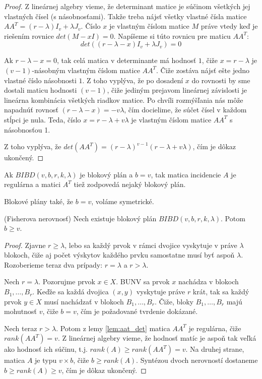 \begin{proof}
Z lineárnej algebry vieme, že determinant matice je súčinom všetkých jej vlastných čísel (s násobnosťami).
Takže treba nájsť všetky vlastné čísla matice $A A^T = (r-\lambda) I_v + \lambda J_{v}$.
Číslo $x$ je vlastným číslom matice $M$ práve vtedy keď je riešením rovnice $det(M - xI) = 0$.
Napíšeme si túto rovnicu pre maticu $AA^T$:
$$det((r-\lambda - x) I_v + \lambda J_{v}) = 0$$

Ak $r-\lambda - x = 0$, tak celá matica v determinante má hodnosť $1$, čiže $x = r - \lambda$ je $(v-1)$-násobným vlastným číslom matice $AA^T$. 
Čiže zostáva nájsť ešte jedno vlastné číslo násobnosti $1$.
Z toho vyplýva, že po dosadení $x$ do rovnosti by sme dostali maticu hodnosti $(v-1)$, čiže jediným prejavom lineárnej závislosti je lineárna kombinácia všetkých riadkov matice.
Po chvíli rozmýšľania nás môže napadnúť rovnosť $(r - \lambda - x) = - v \lambda$, čím docielime, že súčet čísel v každom stĺpci je nula.
Teda, číslo $x =r - \lambda + v\lambda $ je vlastným číslom matice $A A^T$ s násobnosťou 1.

Z toho vyplýva, že $det(AA^T) = (r - \lambda)^{v-1}(r - \lambda + v \lambda)$, čím je dôkaz ukončený.
\end{proof}

\begin{corollary}
Ak $BIBD(v, b,r, k, \lambda)$ je blokový plán a $b=v$, tak matica incidencie $A$ je regulárna a matici $A^T$ tiež zodpovedá nejaký blokový plán.
\end{corollary}

\begin{remark}
Blokové plány také, že $b = v$, voláme symetrické.
\end{remark}


\begin{theorem}{(Fisherova nerovnosť)}
Nech existuje blokový plán $BIBD(v, b,r, k, \lambda)$. Potom $b \geq v$.
\end{theorem}


\begin{proof}
Zjavne $r \geq \lambda$, lebo sa každý prvok v rámci dvojice vyskytuje v práve $\lambda$ blokoch, čiže aj počet výskytov každého prvku samostatne musí byť aspoň $\lambda$.
Rozoberieme teraz dva prípady: $r = \lambda$ a $r > \lambda$.

Nech $r = \lambda$. 
Pozorujme prvok $x \in X$.
BUNV sa prvok $x$ nachádza v blokoch $B_1, \ldots, B_r$.
Keďže sa každá dvojica $(x, y)$ vyskytuje práve $r$ krát, tak sa každý prvok $y \in X$ musí nachádzať v blokoch $B_1, \ldots, B_r$.
Čiže, bloky $B_1, \ldots, B_r$ majú mohutnosť $v$, čiže $b = v$, čím je požadované tvrdenie dokázané.

Nech teraz $r > \lambda$.
Potom z lemy \ref{lem:aat_det} matica $AA^T$ je regulárna, čiže $rank(AA^T) = v$.
Z lineárnej algebry vieme, že hodnosť matíc je aspoň tak veľká ako hodnosť ich súčinu, t.j. $rank(A) \geq rank(AA^T) = v$.
Na druhej strane, matica $A$ je typu $v \times b$, čiže $b \geq rank(A)$.
Syntézou dvoch nerovností dostaneme $b \geq rank(A) \geq v$, čím je dôkaz ukončený.
\end{proof}


